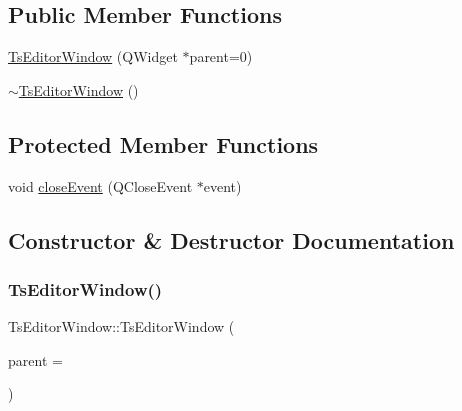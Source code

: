 \subsection*{Public Member Functions}
\begin{DoxyCompactItemize}
\item 
\mbox{\hyperlink{class_ts_editor_window_adfdd7939ce7ee2404533f42c7497a5f7}{Ts\+Editor\+Window}} (Q\+Widget $\ast$parent=0)
\item 
\mbox{\hyperlink{class_ts_editor_window_a7d76499e6ea001ec114b3cc4c9575db3}{$\sim$\+Ts\+Editor\+Window}} ()
\end{DoxyCompactItemize}
\subsection*{Protected Member Functions}
\begin{DoxyCompactItemize}
\item 
void \mbox{\hyperlink{class_ts_editor_window_a096813837956da71e648bfad57459bfb}{close\+Event}} (Q\+Close\+Event $\ast$event)
\end{DoxyCompactItemize}


\subsection{Constructor \& Destructor Documentation}
\mbox{\label{class_ts_editor_window_adfdd7939ce7ee2404533f42c7497a5f7}} 
\subsubsection{\texorpdfstring{TsEditorWindow()}{TsEditorWindow()}}
{\footnotesize\ttfamily Ts\+Editor\+Window\+::\+Ts\+Editor\+Window (\begin{DoxyParamCaption}\item[{Q\+Widget $\ast$}]{parent = {} }\end{DoxyParamCaption})\hspace{0.3cm}{\ttfamily [explicit]}}

\mbox{\label{class_ts_editor_window_a7d76499e6ea001ec114b3cc4c9575db3}} 

